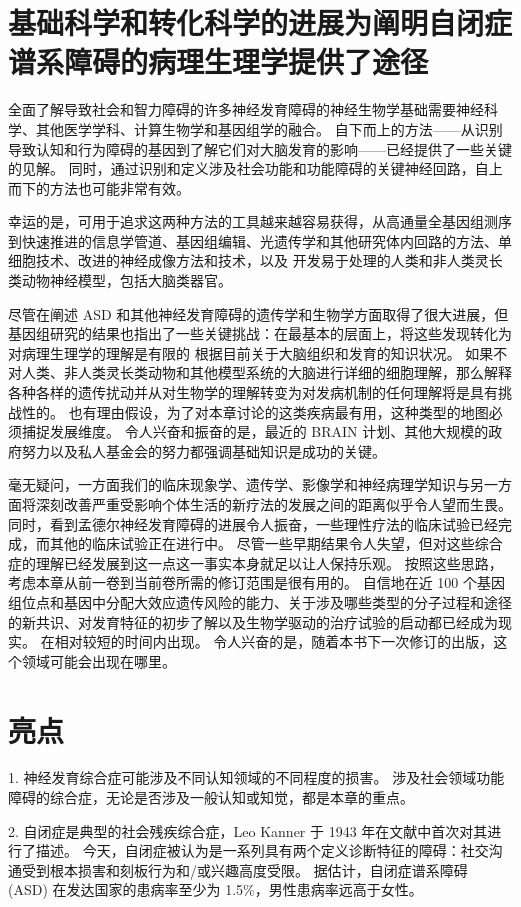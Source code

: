 \section{基础科学和转化科学的进展为阐明自闭症谱系障碍的病理生理学提供了途径}
全面了解导致社会和智力障碍的许多神经发育障碍的神经生物学基础需要神经科学、其他医学学科、计算生物学和基因组学的融合。 自下而上的方法——从识别导致认知和行为障碍的基因到了解它们对大脑发育的影响——已经提供了一些关键的见解。 同时，通过识别和定义涉及社会功能和功能障碍的关键神经回路，自上而下的方法也可能非常有效。

幸运的是，可用于追求这两种方法的工具越来越容易获得，从高通量全基因组测序到快速推进的信息学管道、基因组编辑、光遗传学和其他研究体内回路的方法、单细胞技术、改进的神经成像方法和技术，以及 开发易于处理的人类和非人类灵长类动物神经模型，包括大脑类器官。

尽管在阐述 ASD 和其他神经发育障碍的遗传学和生物学方面取得了很大进展，但基因组研究的结果也指出了一些关键挑战：在最基本的层面上，将这些发现转化为对病理生理学的理解是有限的 根据目前关于大脑组织和发育的知识状况。 如果不对人类、非人类灵长类动物和其他模型系统的大脑进行详细的细胞理解，那么解释各种各样的遗传扰动并从对生物学的理解转变为对发病机制的任何理解将是具有挑战性的。 也有理由假设，为了对本章讨论的这类疾病最有用，这种类型的地图必须捕捉发展维度。 令人兴奋和振奋的是，最近的 BRAIN 计划、其他大规模的政府努力以及私人基金会的努力都强调基础知识是成功的关键。

毫无疑问，一方面我们的临床现象学、遗传学、影像学和神经病理学知识与另一方面将深刻改善严重受影响个体生活的新疗法的发展之间的距离似乎令人望而生畏。 同时，看到孟德尔神经发育障碍的进展令人振奋，一些理性疗法的临床试验已经完成，而其他的临床试验正在进行中。 尽管一些早期结果令人失望，但对这些综合症的理解已经发展到这一点这一事实本身就足以让人保持乐观。 按照这些思路，考虑本章从前一卷到当前卷所需的修订范围是很有用的。 自信地在近 100 个基因组位点和基因中分配大效应遗传风险的能力、关于涉及哪些类型的分子过程和途径的新共识、对发育特征的初步了解以及生物学驱动的治疗试验的启动都已经成为现实。 在相对较短的时间内出现。 令人兴奋的是，随着本书下一次修订的出版，这个领域可能会出现在哪里。


\section{亮点}
1. 神经发育综合症可能涉及不同认知领域的不同程度的损害。 涉及社会领域功能障碍的综合症，无论是否涉及一般认知或知觉，都是本章的重点。 

2. 自闭症是典型的社会残疾综合症，Leo Kanner 于 1943 年在文献中首次对其进行了描述。 今天，自闭症被认为是一系列具有两个定义诊断特征的障碍：社交沟通受到根本损害和刻板行为和/或兴趣高度受限。 据估计，自闭症谱系障碍 (ASD) 在发达国家的患病率至少为 1.5\%，男性患病率远高于女性。 

